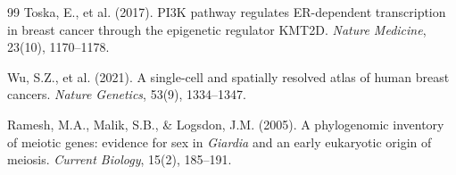 \documentclass[12pt, a4paper]{article}
\theoremstyle{definition}
\theoremstyle{remark}
\begin{document}
\begin{thebibliography}{99}
Toska, E., et al. (2017).
PI3K pathway regulates ER-dependent transcription in
breast cancer through the epigenetic regulator KMT2D.
\textit{Nature Medicine}, 23(10), 1170--1178.

Wu, S.Z., et al. (2021).
A single-cell and spatially resolved atlas of human
breast cancers.
\textit{Nature Genetics}, 53(9), 1334--1347.

Ramesh, M.A., Malik, S.B., \& Logsdon, J.M. (2005).
A phylogenomic inventory of meiotic genes: evidence for
sex in \textit{Giardia} and an early eukaryotic origin
of meiosis.
\textit{Current Biology}, 15(2), 185--191.

\end{thebibliography}

\end{document}

